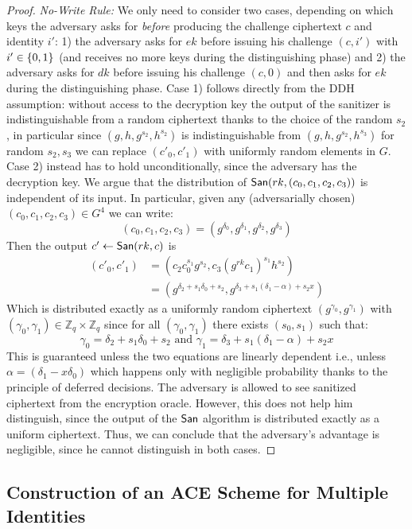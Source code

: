 \documentclass{llncs}
\begin{document}
\begin{proof}
\noindent \emph{No-Write Rule:}
We only need to consider two cases, depending on which keys the adversary asks for \emph{before} producing the challenge ciphertext $c$ and identity $i'$: 1) the adversary asks for $ek$ before issuing his challenge $(c,i')$ with $i'\in\{0,1\}$ (and receives no more keys during the distinguishing phase) and 2) the adversary asks for $dk$ before issuing his challenge $(c,0)$ and then asks for $ek$ during the distinguishing phase. Case 1) follows directly from the DDH assumption: without access to the decryption key the output of the sanitizer is indistinguishable from a random ciphertext thanks to the choice of the random $s_2$, in particular since $(g,h,g^{s_2},h^{s_2})$ is indistinguishable from $(g,h,g^{s_2},h^{s_3})$ for random $s_2,s_3$ we can replace $(c'_0,c'_1)$ with uniformly random elements in $G$. Case 2) instead has to hold unconditionally, since the adversary has the decryption key. We argue that the distribution of $\mathsf{San}(rk,(c_0,c_1,c_2,c_3))$ is independent of its input. In particular, given any (adversarially chosen) $(c_0,c_1,c_2,c_3)\in  G^4 $ we can write:
$$
(c_0,c_1,c_2,c_3)=(g^{\delta_0},g^{\delta_1},g^{\delta_2} ,g^{\delta_3}  )
$$
Then the output $c'\leftarrow \mathsf{San}(rk,c)$ is
\begin{align*}
(c'_0,c'_1) &=  (c_2c_0^{s_1}g^{s_2},c_3 (g^{rk} c_1)^{s_1} h^{s_2}) \\
&= (g^{\delta_2+s_1\delta_0+s_2},g^{\delta_3+s_1(\delta_1-\alpha)+s_2x} )
\end{align*}
Which is distributed exactly as a uniformly random ciphertext $(g^{\gamma_0},g^{\gamma_1})$ with $(\gamma_0,\gamma_1)\in  \mathbb{Z}_{q}\times\mathbb{Z}_{q}$ since for all $(\gamma_0,\gamma_1)$ there exists $(s_0,s_1)$ such that:
$$
\gamma_0 = \delta_2+s_1\delta_0+s_2 \mbox{ and } \gamma_1=\delta_3+s_1(\delta_1-\alpha)+s_2x
$$
This is guaranteed unless the two equations are linearly dependent i.e., unless $\alpha=(\delta_1-x\delta_0)$ which happens only with negligible probability thanks to the principle of deferred decisions.
The adversary is allowed to see sanitized ciphertext from the encryption oracle. However, this does not help him distinguish, since the output of the $\mathsf{San}$ algorithm is distributed exactly as a uniform ciphertext.
Thus, we can conclude that the adversary's advantage is negligible, since he cannot distinguish in both cases.
\end{proof}



\subsection{Construction of an ACE Scheme for Multiple Identities}
\end{document}
